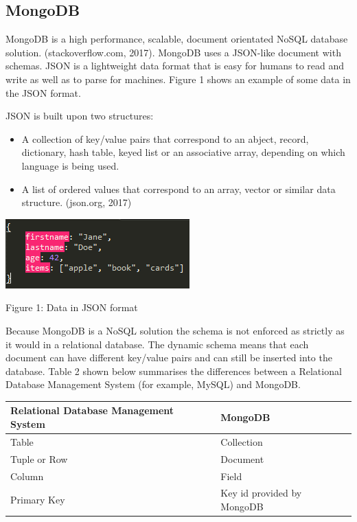 \documentclass[12pt]{article}
\begin{document}
\subsection{MongoDB}
MongoDB is a high performance, scalable, document orientated NoSQL database solution. (stackoverflow.com, 2017). MongoDB uses a JSON-like document with schemas. JSON is a lightweight data format that is easy for humans to read and write as well as to parse for machines. Figure 1 shows an example of some data in the JSON format.

JSON is built upon two structures: 
\begin{itemize}
	\item A collection of key/value pairs that correspond to an abject, record, dictionary, hash table, keyed list or an associative array, depending on which language is being used.
	\item A list of ordered values that correspond to an array, vector or similar data structure. (json.org, 2017)
\end{itemize}

\begin{center}
	\includegraphics[scale=1]{json_no_id.PNG}

	Figure 1: Data in JSON format
\end{center}

Because MongoDB is a NoSQL solution the schema is not enforced as strictly as it would in a relational database. The dynamic schema means that each document can have different key/value pairs and can still be inserted into the database. Table 2 shown below summarises the differences between a Relational Database Management System (for example, MySQL) and MongoDB.

\begin{center}
    \begin{tabular}{| l | l |}
    \hline
    \textbf{Relational Database Management System} & \textbf{MongoDB}  \\ \hline
    Table & Collection \\ \hline
    Tuple or Row & Document \\ \hline
    Column & Field \\ \hline
    Primary Key & Key id provided by MongoDB \\ \hline
    \end{tabular}
\end{center}
\end{document}
